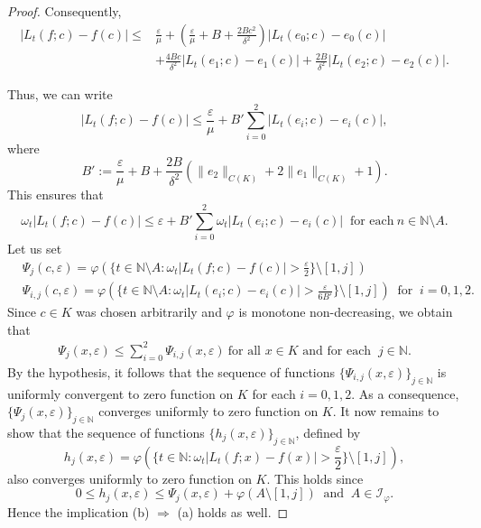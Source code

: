 \documentclass[reqno]{amsart}
\begin{document}
{\begin{proof}
Consequently,
\begin{align*}
|L_t(f; c) - f(c)| \leq 
&\frac{\varepsilon}{\mu}+ \left(\frac{\varepsilon}{\mu} + B + \frac{2B c^2}{\delta^2} \right) |L_t(e_0; c) - e_0(c)|\\& 
+ \frac{4B c}{\delta^2} |L_t(e_1; c) - e_1(c)| + \frac{2B}{\delta^2} |L_t(e_2; c) - e_2(c)|.
\end{align*}

Thus, we can write
\begin{equation*}
	|L_t(f; c) - f(c)| \leq \frac{\varepsilon}{\mu} + B' \sum_{i=0}^2 |L_t(e_i; c) - e_i(c)|, 
\end{equation*}
where
\[
B' := \frac{\varepsilon}{\mu} + B + \frac{2B}{\delta^2} \left( \|e_2\|_{C(K)} + 2\|e_1\|_{C(K)} + 1 \right).
\]
This ensures that
$$
\omega_t |L_t(f; c) - f(c)| \leq \varepsilon + B' \sum_{i=0}^2 \omega_t|L_t(e_i; c) - e_i(c)|~\mbox{ for each}~n\in\mathbb{N}\setminus A. 
$$
Let us set 
\begin{align*}
&\Psi_j(c,\varepsilon)=\varphi(\{t\in\mathbb{N}\setminus A:\omega_t |L_t(f; c) - f(c)|>\frac{\varepsilon}{2}\}\setminus [1,j])\\
&\Psi_{i,j}(c,\varepsilon)=\varphi(\{t\in\mathbb{N}\setminus A:\omega_t |L_t(e_i; c) - e_i(c)|>\frac{\varepsilon}{6B'}\}\setminus [1,j])~\mbox{ for }~i=0,1,2.
\end{align*}
Since $c\in K$ was chosen arbitrarily and  $\varphi$  is monotone non-decreasing, we obtain that
\begin{align*}
\Psi_j(x,\varepsilon)\leq \displaystyle \sum_{i=0}^{2}\Psi_{i,j}(x,\varepsilon)~\mbox{for all $x\in K$ and for each }~j\in\mathbb{N}.
\end{align*}
By the hypothesis, it follows that the sequence of functions $\{\Psi_{i,j}(x,\varepsilon)\}_{j\in\mathbb{N}}$ is uniformly convergent to zero function on $K$ for each $i=0,1,2$. As a consequence, $\{\Psi_j(x,\varepsilon)\}_{j\in\mathbb{N}}$ converges uniformly to zero function on $K$. It now remains to show that the sequence of functions $\{h_j(x,\varepsilon)\}_{j\in\mathbb{N}}$, defined by 
$$
h_j(x,\varepsilon)=\varphi(\{t\in\mathbb{N}:\omega_t |L_t(f; x) - f(x)|>\frac{\varepsilon}{2}\}\setminus [1,j]),
$$
also converges uniformly to zero function on $K$. This holds since
$$
0\leq h_j(x,\varepsilon)\leq \Psi_j(x,\varepsilon)+\varphi(A\setminus [1,j])~\mbox{ and }~A\in\mathcal{I}_{\varphi}.
$$
Hence the implication (b) $\Rightarrow$ (a) holds as well.
\end{proof}


}
\end{document}
